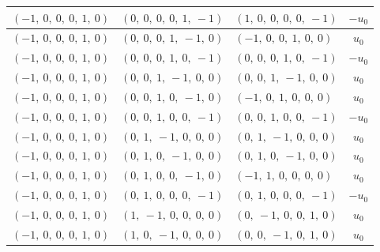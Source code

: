 \documentclass[11pt]{article}
\theoremstyle{definition}
\begin{document}
\begin{longtable}{|l|l|l|c|}
    \hline
    $\left( -1, \  0, \  0, \  0, \  1, \  0\right)$ & $\left( 0, \  0, \  0, \  0, \  1, \  -1\right)$ & $\left( 1, \  0, \  0, \  0, \  0, \  -1\right)$ & $- u_{0}$ \\
    \hline
    $\left( -1, \  0, \  0, \  0, \  1, \  0\right)$ & $\left( 0, \  0, \  0, \  1, \  -1, \  0\right)$ & $\left( -1, \  0, \  0, \  1, \  0, \  0\right)$ & $u_{0}$ \\
    \hline
    $\left( -1, \  0, \  0, \  0, \  1, \  0\right)$ & $\left( 0, \  0, \  0, \  1, \  0, \  -1\right)$ & $\left( 0, \  0, \  0, \  1, \  0, \  -1\right)$ & $- u_{0}$ \\
    \hline
    $\left( -1, \  0, \  0, \  0, \  1, \  0\right)$ & $\left( 0, \  0, \  1, \  -1, \  0, \  0\right)$ & $\left( 0, \  0, \  1, \  -1, \  0, \  0\right)$ & $u_{0}$ \\
    \hline
    $\left( -1, \  0, \  0, \  0, \  1, \  0\right)$ & $\left( 0, \  0, \  1, \  0, \  -1, \  0\right)$ & $\left( -1, \  0, \  1, \  0, \  0, \  0\right)$ & $u_{0}$ \\
    \hline
    $\left( -1, \  0, \  0, \  0, \  1, \  0\right)$ & $\left( 0, \  0, \  1, \  0, \  0, \  -1\right)$ & $\left( 0, \  0, \  1, \  0, \  0, \  -1\right)$ & $- u_{0}$ \\
    \hline
    $\left( -1, \  0, \  0, \  0, \  1, \  0\right)$ & $\left( 0, \  1, \  -1, \  0, \  0, \  0\right)$ & $\left( 0, \  1, \  -1, \  0, \  0, \  0\right)$ & $u_{0}$ \\
    \hline
    $\left( -1, \  0, \  0, \  0, \  1, \  0\right)$ & $\left( 0, \  1, \  0, \  -1, \  0, \  0\right)$ & $\left( 0, \  1, \  0, \  -1, \  0, \  0\right)$ & $u_{0}$ \\
    \hline
    $\left( -1, \  0, \  0, \  0, \  1, \  0\right)$ & $\left( 0, \  1, \  0, \  0, \  -1, \  0\right)$ & $\left( -1, \  1, \  0, \  0, \  0, \  0\right)$ & $u_{0}$ \\
    \hline
    $\left( -1, \  0, \  0, \  0, \  1, \  0\right)$ & $\left( 0, \  1, \  0, \  0, \  0, \  -1\right)$ & $\left( 0, \  1, \  0, \  0, \  0, \  -1\right)$ & $- u_{0}$ \\
    \hline
    $\left( -1, \  0, \  0, \  0, \  1, \  0\right)$ & $\left( 1, \  -1, \  0, \  0, \  0, \  0\right)$ & $\left( 0, \  -1, \  0, \  0, \  1, \  0\right)$ & $u_{0}$ \\
    \hline
    $\left( -1, \  0, \  0, \  0, \  1, \  0\right)$ & $\left( 1, \  0, \  -1, \  0, \  0, \  0\right)$ & $\left( 0, \  0, \  -1, \  0, \  1, \  0\right)$ & $u_{0}$ \\

\end{longtable}
\end{document}
